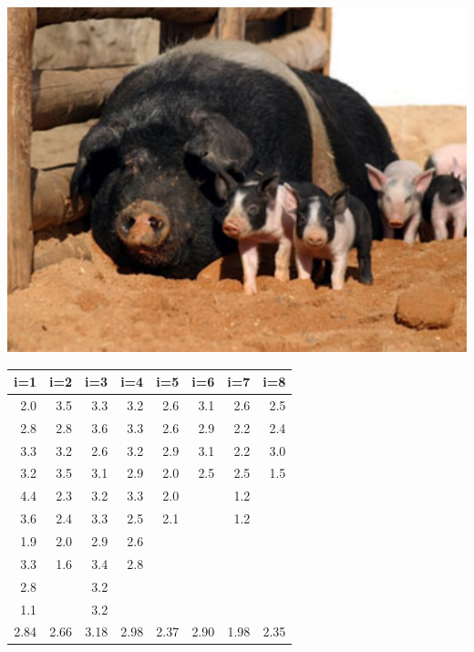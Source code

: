 \begin{frame}
\begin{analysis}

\smallskip

\begin{minipage}[c]{0.33\linewidth}
\includegraphics[width=1.0\linewidth]{../LectureAssets/L07/piglets}
\end{minipage} 
\begin{minipage}[r]{0.65\linewidth}
\begin{center}
\begin{tiny}
\tabcolsep=0.11cm
\begin{tabular}{rrrrrrrr}
  \hline
 i=1 & i=2 & i=3 & i=4 & i=5 & i=6 & i=7 & i=8 \\ 
  \hline
  2.0 & 3.5 & 3.3 & 3.2 & 2.6 & 3.1 & 2.6 & 2.5 \\ 
  2.8 & 2.8 & 3.6 & 3.3 & 2.6 & 2.9 & 2.2 & 2.4 \\ 
  3.3 & 3.2 & 2.6 & 3.2 & 2.9 & 3.1 & 2.2 & 3.0 \\ 
  3.2 & 3.5 & 3.1 & 2.9 & 2.0 & 2.5 & 2.5 & 1.5 \\ 
  4.4 & 2.3 & 3.2 & 3.3 & 2.0 &  & 1.2 &  \\ 
  3.6 & 2.4 & 3.3 & 2.5 & 2.1 &  & 1.2 &  \\ 
  1.9 & 2.0 & 2.9 & 2.6 &  &  &  &  \\ 
  3.3 & 1.6 & 3.4 & 2.8 &  &  &  &  \\ 
  2.8 &  & 3.2 &  &  &  &  &  \\ 
  1.1 &  & 3.2 &  &  &  &  &  \\ 
  \hline
  2.84 & 2.66 & 3.18 & 2.98 & 2.37 & 2.90&  1.98 & 2.35  \\
  

\end{tabular}
\end{tiny}
\end{center}
\end{minipage}
\end{analysis}
\end{frame}
